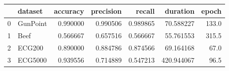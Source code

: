 \begin{tabular}{llrrrrr}
\toprule
{} &   dataset &  accuracy &  precision &    recall &    duration &  epoch \\
\midrule
0 &  GunPoint &  0.990000 &   0.990506 &  0.989865 &   70.588227 &  133.0 \\
1 &      Beef &  0.566667 &   0.657516 &  0.566667 &   55.761553 &  315.5 \\
2 &    ECG200 &  0.890000 &   0.884786 &  0.874566 &   69.164168 &   67.0 \\
3 &   ECG5000 &  0.939556 &   0.714889 &  0.547213 &  420.944067 &   96.5 \\
\bottomrule
\end{tabular}
